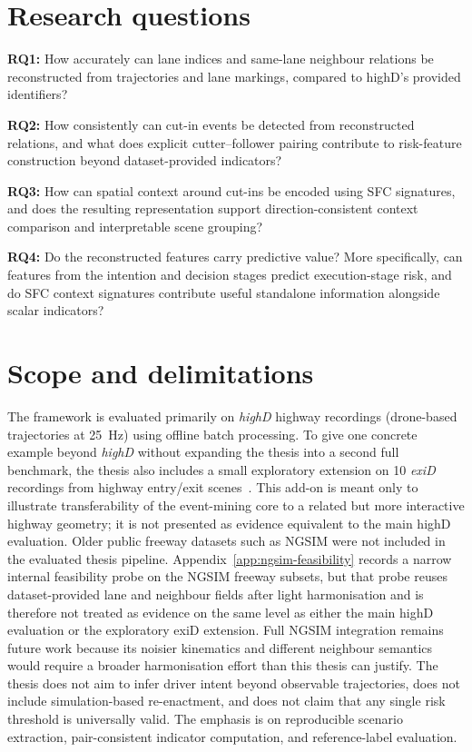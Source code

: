 \documentclass[12pt,a4paper,twoside,openright]{report}
\begin{document}
    \section{Research questions}
    \textbf{RQ1:} How accurately can lane indices and same-lane neighbour relations be reconstructed from trajectories and lane markings, compared to highD's provided identifiers?

    \textbf{RQ2:} How consistently can cut-in events be detected from reconstructed relations, and what does explicit cutter--follower pairing contribute to risk-feature construction beyond dataset-provided indicators?

    \textbf{RQ3:} How can spatial context around cut-ins be encoded using SFC signatures, and does the resulting representation support direction-consistent context comparison and interpretable scene grouping?

    \textbf{RQ4:} Do the reconstructed features carry predictive value? More specifically, can features from the intention and decision stages predict execution-stage risk, and do SFC context signatures contribute useful standalone information alongside scalar indicators?

    \section{Scope and delimitations}
    The framework is evaluated primarily on \textit{highD} highway recordings (drone-based trajectories at \SI{25}{\hertz}) using offline batch processing. To give one concrete example beyond \textit{highD} without expanding the thesis into a second full benchmark, the thesis also includes a small exploratory extension on 10 \textit{exiD} recordings from highway entry/exit scenes~\cite{moers2022exid}. This add-on is meant only to illustrate transferability of the event-mining core to a related but more interactive highway geometry; it is not presented as evidence equivalent to the main highD evaluation. Older public freeway datasets such as NGSIM were not included in the evaluated thesis pipeline. Appendix~\ref{app:ngsim-feasibility} records a narrow internal feasibility probe on the NGSIM freeway subsets, but that probe reuses dataset-provided lane and neighbour fields after light harmonisation and is therefore not treated as evidence on the same level as either the main highD evaluation or the exploratory exiD extension. Full NGSIM integration remains future work because its noisier kinematics and different neighbour semantics would require a broader harmonisation effort than this thesis can justify. The thesis does not aim to infer driver intent beyond observable trajectories, does not include simulation-based re-enactment, and does not claim that any single risk threshold is universally valid. The emphasis is on reproducible scenario extraction, pair-consistent indicator computation, and reference-label evaluation.
\end{document}
